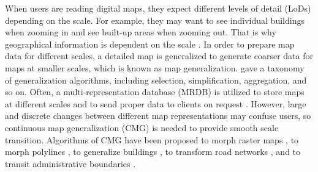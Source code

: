 \documentclass[]{interact}
\begin{document}
When users are reading digital maps,
they expect different levels of detail (LoDs) depending on the scale.
For example, they may want to see individual buildings when zooming in
and see built-up areas when zooming out.
That is why geographical information is dependent on the scale
\citep{Muller1995Generalization,Weibel1997}. 
In order to prepare map data for different scales,
a detailed map is generalized to generate coarser data 
for maps at smaller scales,
which is known as map generalization.
\citet{Mackaness2017Generalization} gave a taxonomy of 
generalization algorithms, 
including selection, simplification, aggregation, and so on.
Often, a multi-representation database (MRDB) is utilized to store
maps at different scales and to send proper data to clients on request
\citep[\eg][]{Hampe2004multiple}.
However, large and discrete changes between different map representations
may confuse users,
so continuous map generalization (CMG) is needed to
provide smooth scale transition.
Algorithms of CMG have been proposed 
to morph raster maps
\citep[\eg][]{Pantazis2009a,Pantazis2009b}, 
to morph polylines
\citep[\eg][]{Noellenburg2008,Peng2013LSA,Deng2015,Li2017Annealing},
to generalize buildings
\citep[\eg][]{Li2017_Building,Peng2017Building,Touya2017Progressive},
to transform road networks
\citep[\eg][]{Suba2016Road,Chimani2014Eat},
and to transit administrative boundaries
\citep[\eg][]{Peng2016Admin}.
\end{document}
